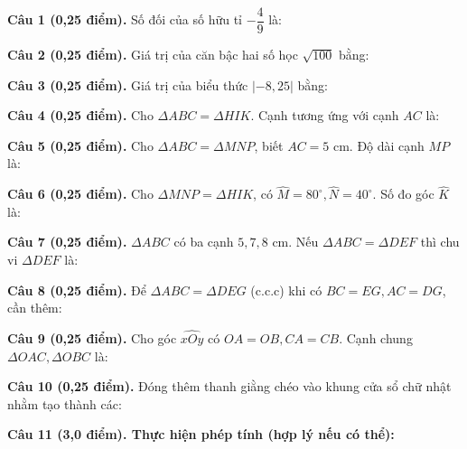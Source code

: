 \documentclass[12pt,a4paper]{article}
\begin{document}
\vspace{1.5mm}
\noindent\textbf{Câu 1 (0,25 điểm).} Số đối của số hữu tỉ $-\dfrac{4}{9}$ là: \par\vspace{2.3mm}
\noindent\textbf{Câu 2 (0,25 điểm).} Giá trị của căn bậc hai số học $\sqrt{100}$ bằng: \par\vspace{2.3mm}
\noindent\textbf{Câu 3 (0,25 điểm).} Giá trị của biểu thức $|-8{,}25|$ bằng: \par\vspace{2.3mm}
\noindent\textbf{Câu 4 (0,25 điểm).} Cho $\Delta ABC = \Delta HIK$. Cạnh tương ứng với cạnh $AC$ là: \par\vspace{2.3mm}
\noindent\textbf{Câu 5 (0,25 điểm).} Cho $\Delta ABC = \Delta MNP$, biết $AC = 5\text{ cm}$. Độ dài cạnh $MP$ là: \par\vspace{2.3mm}
\noindent\textbf{Câu 6 (0,25 điểm).} Cho $\Delta MNP = \Delta HIK$, có $\widehat{M} = 80^\circ, \widehat{N} = 40^\circ$. Số đo góc $\widehat{K}$ là: \par\vspace{2.3mm}
\noindent\textbf{Câu 7 (0,25 điểm).} $\Delta ABC$ có ba cạnh $5, 7, 8\text{ cm}$. Nếu $\Delta ABC = \Delta DEF$ thì chu vi $\Delta DEF$ là: \par\vspace{2.3mm}
\noindent\textbf{Câu 8 (0,25 điểm).} Để $\Delta ABC = \Delta DEG$ (c.c.c) khi có $BC=EG, AC=DG$, cần thêm: \par\vspace{2.3mm}
\noindent\textbf{Câu 9 (0,25 điểm).} Cho góc $\widehat{xOy}$ có $OA = OB, CA = CB$. Cạnh chung $\Delta OAC, \Delta OBC$ là: \par\vspace{2.3mm}
\noindent\textbf{Câu 10 (0,25 điểm).} Đóng thêm thanh giằng chéo vào khung cửa sổ chữ nhật nhằm tạo thành các: \par\vspace{2.3mm}
\vspace{0.2mm}
\noindent\textbf{Câu 11 (3,0 điểm). Thực hiện phép tính (hợp lý nếu có thể):}
\vspace{0.8mm}
\end{document}
